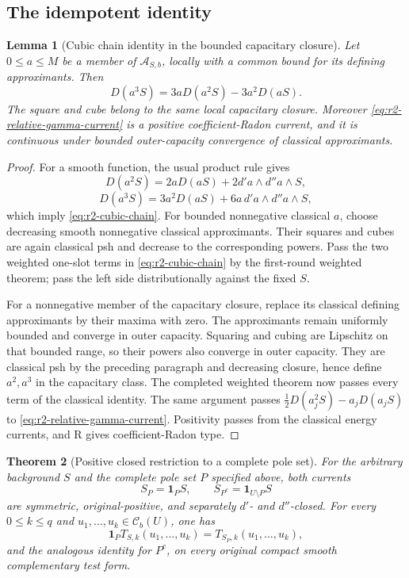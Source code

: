 \documentclass[11pt,a4paper]{article}
\numberwithin{equation}{section}
\newtheorem{theorem}{Theorem}[section]
\newtheorem{lemma}[theorem]{Lemma}
\theoremstyle{definition}
\theoremstyle{remark}
\newcommand{\Cb}{\mathcal C_b}
\begin{document}
\subsection{The idempotent identity}

\begin{lemma}[Cubic chain identity in the bounded capacitary closure]
\label{lem:r2-cubic-chain}
Let $0\leq a\leq M$ be a member of $\mathcal A_{S,b}$, locally
with a common bound for its defining approximants. Then
\begin{equation}
\label{eq:r2-cubic-chain}
 D(a^3S)=3aD(a^2S)-3a^2D(aS).
\end{equation}
The square and cube belong to the same local capacitary closure.
Moreover \eqref{eq:r2-relative-gamma-current} is a positive
coefficient-Radon current, and it is continuous under bounded
outer-capacity convergence of classical approximants.
\end{lemma}

\begin{proof}
For a smooth function, the usual product rule gives
\[
 D(a^2S)=2aD(aS)+2d'a\wedge d''a\wedge S,
\]
\[
 D(a^3S)=3a^2D(aS)+6a\,d'a\wedge d''a\wedge S,
\]
which imply \eqref{eq:r2-cubic-chain}.
For bounded nonnegative classical $a$, choose decreasing smooth
nonnegative classical approximants. Their squares and cubes are
again classical psh and decrease to the corresponding powers.
Pass the two weighted one-slot terms in
\eqref{eq:r2-cubic-chain} by the first-round weighted theorem;
pass the left side distributionally against the fixed $S$.

For a nonnegative member of the capacitary closure, replace its
classical defining approximants by their maxima with zero. The
approximants remain uniformly bounded and converge in outer
capacity. Squaring and cubing are Lipschitz on that bounded
range, so their powers also converge in outer capacity. They
are classical psh by the preceding paragraph and decreasing
closure, hence define $a^2,a^3$ in the capacitary class.
The completed weighted theorem now passes every term of the
classical identity. The same argument passes
$\tfrac12D(a_j^2S)-a_jD(a_jS)$ to
\eqref{eq:r2-relative-gamma-current}. Positivity passes from the
classical energy currents, and R gives coefficient-Radon type.
\end{proof}

\begin{theorem}[Positive closed restriction to a complete pole set]
\label{thm:r2-polar-restriction}
For the arbitrary background $S$ and the complete pole set $P$
specified above, both currents
\[
 S_P=\mathbf1_P S,\qquad S_{P^c}=\mathbf1_{U\setminus P}S
\]
are symmetric, original-positive, and separately $d'$- and
$d''$-closed. For every $0\leq k\leq q$ and
$u_1,\ldots,u_k\in\Cb(U)$, one has
\begin{equation}
\label{eq:r2-polar-restriction-BT}
 \mathbf1_P T_{S,k}(u_1,\ldots,u_k)
       =T_{S_P,k}(u_1,\ldots,u_k),
\end{equation}
and the analogous identity for $P^c$, on every original compact
smooth complementary test form.
\end{theorem}
\end{document}
